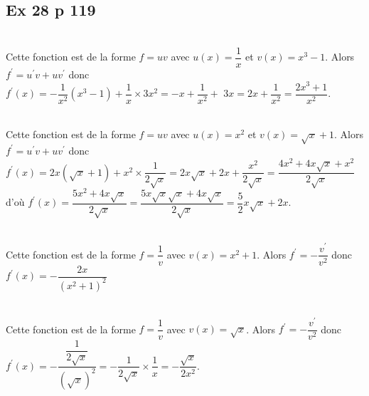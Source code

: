 \documentclass[12pt,a4paper]{book}
\begin{document}
\subsection*{Ex 28 p 119}

\begin{enumMet}
    \item {}\\
    Cette fonction est de la forme $f=u v$ avec $u(x)=\dfrac{1}{x}$ et $v(x)=x^{3}-1$. Alors $f^{\prime}=u^{\prime} v+u v^{\prime}$ donc\\
    $ f^{\prime}(x)=-\dfrac{1}{x^{2}}\left(x^{3}-1\right)+\dfrac{1}{x} \times 3 x^{2}=-x+\dfrac{1}{x^{2}}+$ $3 x=2 x+\dfrac{1}{x^{2}}=\dfrac{2 x^{3}+1}{x^{2}}$.
    \item {}\\
    Cette fonction est de la forme $f=u v$ avec $u(x)=x^{2}$ et $v(x)=\sqrt{x}+1$. Alors  $f^{\prime}=u^{\prime} v+u v^{\prime}$ donc\\
    $f^{\prime}(x)=2 x(\sqrt{x}+1)+x^{2} \times \dfrac{1}{2 \sqrt{x}}=2 x \sqrt{x}+2 x+\dfrac{x^{2}}{2 \sqrt{x}}=\dfrac{4 x^{2}+4 x \sqrt{x}+x^{2}}{2 \sqrt{x}}$\\
d'où $f^{\prime}(x)=\dfrac{5 x^{2}+4 x \sqrt{x}}{2 \sqrt{x}}=\dfrac{5x\sqrt{x}\sqrt{x}+4x\sqrt{x}}{2\sqrt{x}}=\dfrac{5}{2}x\sqrt{x}+2x$.
    \item {}\\
Cette fonction est de la forme $f=\dfrac{1}{v}$ avec $v(x)=x^{2}+1$. Alors $f^{\prime}=-\dfrac{v^{\prime}}{v^{2}}$ donc\\ $f^{\prime}(x)=-\dfrac{2 x}{\left(x^{2}+1\right)^{2}}$
    \item {}\\
Cette fonction est de la forme $f=\dfrac{1}{v}$ avec $v(x)=\sqrt{x}$. Alors $f^{\prime}=-\dfrac{v^{\prime}}{v^{2}}$ donc\\ $f^{\prime}(x)=-\dfrac{\dfrac{1}{2 \sqrt{x}}}{(\sqrt{x})^{2}}=-\dfrac{1}{2 \sqrt{x}} \times \dfrac{1}{x}=-\dfrac{\sqrt{x}}{2 x^{2}}$.
\end{enumMet}
\end{document}
